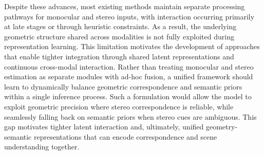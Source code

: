 Despite these advances, most existing methods maintain separate processing pathways for monocular and stereo inputs, with interaction occurring primarily at late stages or through heuristic constraints.
As a result, the underlying geometric structure shared across modalities is not fully exploited during representation learning.
This limitation motivates the development of approaches that enable tighter integration through shared latent representations and continuous cross-modal interaction.
Rather than treating monocular and stereo estimation as separate modules with ad-hoc fusion, a unified framework should learn to dynamically balance geometric correspondence and semantic priors within a single inference process.
Such a formulation would allow the model to exploit geometric precision where stereo correspondence is reliable, while seamlessly falling back on semantic priors when stereo cues are ambiguous.
This gap motivates tighter latent interaction and, ultimately, unified geometry-semantic representations that can encode correspondence and scene understanding together.

